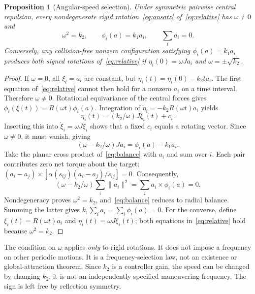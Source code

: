 \documentclass[conference]{IEEEtran}
\newcommand{\norm}[1]{\lVert#1\rVert}
\newtheorem{proposition}{Proposition}
\begin{document}
\begin{proposition}[Angular-speed selection]\label{prop:frequency}
Under symmetric pairwise central repulsion, every nondegenerate rigid rotation~\eqref{eq:ansatz} of~\eqref{eq:relative} has $\omega\ne0$ and
\begin{equation}
 \omega^2=k_2,\qquad
 \phi_i(a)=k_1a_i,\qquad \sum_i a_i=0.
 \label{eq:selection}
\end{equation}
Conversely, any collision-free nonzero configuration satisfying $\phi_i(a)=k_1a_i$ produces both signed rotations of~\eqref{eq:relative} if $\eta_i(0)=\omega Ja_i$ and $\omega=\pm\sqrt{k_2}$.
\end{proposition}
\begin{proof}
If $\omega=0$, all $\xi_i=a_i$ are constant, but $\eta_i(t)=\eta_i(0)-k_2ta_i$. The first equation of~\eqref{eq:relative} cannot then hold for a nonzero $a_i$ on a time interval. Therefore $\omega\ne0$. Rotational equivariance of the central forces gives $\phi_i(\xi(t))=R(\omega t)\phi_i(a)$. Integration of $\dot\eta_i=-k_2R(\omega t)a_i$ yields
\begin{equation}
 \eta_i(t)=(k_2/\omega)J\xi_i(t)+c_i.
 \label{eq:observerorbit}
\end{equation}
Inserting this into $\dot\xi_i=\omega J\xi_i$ shows that a fixed $c_i$ equals a rotating vector. Since $\omega\ne0$, it must vanish, giving
\begin{equation}
 (\omega-k_2/\omega)Ja_i=\phi_i(a)-k_1a_i.
 \label{eq:balance}
\end{equation}
Take the planar cross product of~\eqref{eq:balance} with $a_i$ and sum over $i$. Each pair contributes zero net torque about the target: $(a_i-a_j)\times[\alpha(s_{ij})(a_i-a_j)/s_{ij}]=0$. Consequently,
\begin{equation}
 (\omega-k_2/\omega)\sum_i\norm{a_i}^2
 =\sum_i a_i\times\phi_i(a)=0.
 \label{eq:torque}
\end{equation}
Nondegeneracy proves $\omega^2=k_2$, and~\eqref{eq:balance} reduces to radial balance. Summing the latter gives $k_1\sum_i a_i=\sum_i\phi_i(a)=0$. For the converse, define $\xi_i(t)=R(\omega t)a_i$ and $\eta_i(t)=\omega J\xi_i(t)$; both equations in~\eqref{eq:relative} hold because $\omega^2=k_2$.
\end{proof}

The condition on $\omega$ applies \emph{only} to rigid rotations. It does not impose a frequency on other periodic motions. It is a frequency-selection law, not an existence or global-attraction theorem. Since $k_2$ is a controller gain, the speed can be changed by changing $k_2$; it is not an independently specified maneuvering frequency. The sign is left free by reflection symmetry.
\end{document}
